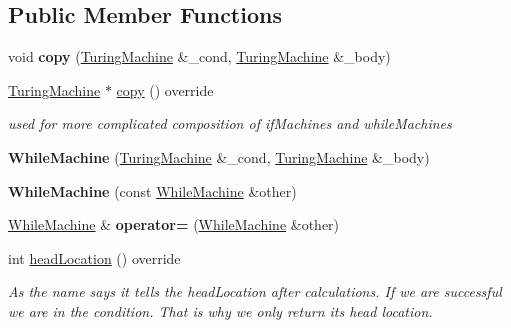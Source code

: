 \subsection*{Public Member Functions}
\begin{DoxyCompactItemize}
\item 
\mbox{\label{class_while_machine_ab7323936db4e386b1ac1c3852fdc4ed1}} 
void {\bfseries copy} (\mbox{\hyperlink{class_turing_machine}{Turing\+Machine}} \&\+\_\+cond, \mbox{\hyperlink{class_turing_machine}{Turing\+Machine}} \&\+\_\+body)
\item 
\mbox{\label{class_while_machine_a8aa083814c022764a3ead2ab6a68d418}} 
\mbox{\hyperlink{class_turing_machine}{Turing\+Machine}} $\ast$ \mbox{\hyperlink{class_while_machine_a8aa083814c022764a3ead2ab6a68d418}{copy}} () override
\begin{DoxyCompactList}\small\item\em used for more complicated composition of if\+Machines and while\+Machines \end{DoxyCompactList}\item 
\mbox{\label{class_while_machine_a12dd54b05d3cdebce91a5c65dd1a2f25}} 
{\bfseries While\+Machine} (\mbox{\hyperlink{class_turing_machine}{Turing\+Machine}} \&\+\_\+cond, \mbox{\hyperlink{class_turing_machine}{Turing\+Machine}} \&\+\_\+body)
\item 
\mbox{\label{class_while_machine_a7cf9c58084ef335835e2bc8295e5a943}} 
{\bfseries While\+Machine} (const \mbox{\hyperlink{class_while_machine}{While\+Machine}} \&other)
\item 
\mbox{\label{class_while_machine_a82027b39573de6439c74c31ec123895a}} 
\mbox{\hyperlink{class_while_machine}{While\+Machine}} \& {\bfseries operator=} (\mbox{\hyperlink{class_while_machine}{While\+Machine}} \&other)
\item 
\mbox{\label{class_while_machine_ab355d0629098690ece0a44c1e22d76ea}} 
int \mbox{\hyperlink{class_while_machine_ab355d0629098690ece0a44c1e22d76ea}{head\+Location}} () override
\begin{DoxyCompactList}\small\item\em As the name says it tells the head\+Location after calculations. If we are successful we are in the condition. That is why we only return it\textquotesingle{}s head location. \end{DoxyCompactList}\item 

\end{DoxyCompactItemize}

